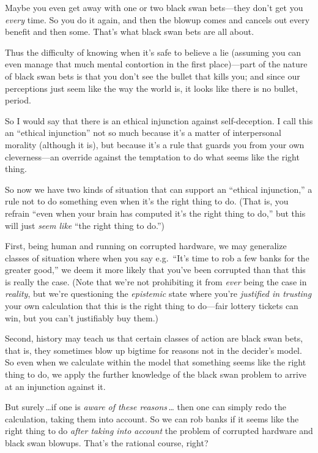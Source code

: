  Maybe you even get away with one or two black swan bets---they
don't get you \textit{every} time. So you do it again,
and then the blowup comes and cancels out every benefit and then some.
That's what black swan bets are all about.


 Thus the difficulty of knowing when it's safe to
believe a lie (assuming you can even manage that much mental contortion
in the first place)---part of the nature of black swan bets is that you
don't see the bullet that kills you; and since our
perceptions just seem like the way the world is, it looks like there is
no bullet, period.


 So I would say that there is an ethical injunction against
self-deception. I call this an ``ethical
injunction'' not so much because it's
a matter of interpersonal morality (although it is), but because
it's a rule that guards you from your own
cleverness---an override against the temptation to do what seems like
the right thing.


 So now we have two kinds of situation that can support an
``ethical injunction,'' a rule not
to do something even when it's the right thing to do.
(That is, you refrain ``even when your brain has
computed it's the right thing to
do,'' but this will just \textit{seem like}
``the right thing to do.'')


First, being human and running on corrupted hardware, we may
generalize classes of situation where when you say e.g.~``It's
time to rob a few banks for the
greater good,'' we deem it more likely that
you've been corrupted than that this is really the
case. (Note that we're not prohibiting it from
\textit{ever} being the case in \textit{reality}, but
we're questioning the \textit{epistemic} state where
you're \textit{justified in trusting} your own
calculation that this is the right thing to do---fair lottery tickets
can win, but you can't justifiably buy them.)


 Second, history may teach us that certain classes of action are
black swan bets, that is, they sometimes blow up bigtime for reasons
not in the decider's model. So even when we calculate
within the model that something seems like the right thing to do, we
apply the further knowledge of the black swan problem to arrive at an
injunction against it.


 But surely\,\ldots if one is \textit{aware of these reasons}\,\ldots
then one can simply redo the calculation, taking them into account. So
we can rob banks if it seems like the right thing to do \textit{after
taking into account} the problem of corrupted hardware and black swan
blowups. That's the rational course, right?


